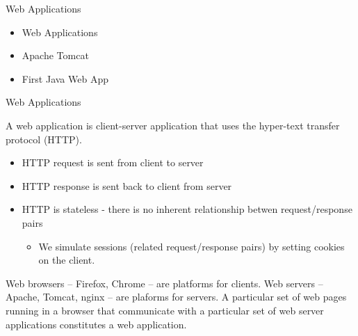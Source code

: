 \documentclass{beamer}
\author[Chris Simpkins] 
{Christopher Simpkins \\\texttt{chris.simpkins@gatech.edu}}
\institute[Georgia Tech] %
\date[CS 1331]{}
\begin{document}
\begin{frame}
  \titlepage
\end{frame}


\begin{frame}[fragile]{Web Applications}


\begin{itemize}
\item Web Applications
\item Apache Tomcat
\item First Java Web App
\end{itemize}

\end{frame}

\begin{frame}[fragile]{Web Applications}


A web application is client-server application that uses  the hyper-text transfer protocol (HTTP).
\begin{itemize}
\item HTTP request is sent from client to server
\item HTTP response is sent back to client from server
\item HTTP is stateless - there is no inherent relationship betwen request/response pairs
\begin{itemize}
\item We simulate sessions (related request/response pairs) by setting cookies on the client.
\end{itemize}
\end{itemize}
Web browsers -- Firefox, Chrome -- are platforms for clients.  Web servers -- Apache, Tomcat, nginx -- are plaforms for servers.  A particular set of web pages running in a browser that communicate with a particular set of web server applications constitutes a web application.

\end{frame}
\end{document}
